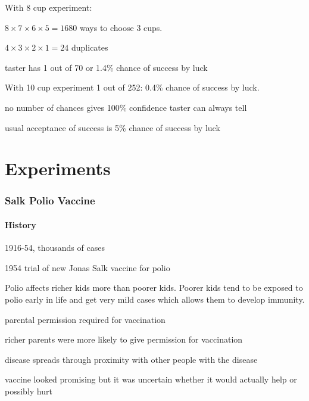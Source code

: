 \documentclass[landscape]{exam}
\begin{document}
  With 8 cup experiment:
  \begin{itemize*}
    \item $8 \times 7 \times 6 \times 5 = 1680$ ways to choose 3 cups.  
    \item $4 \times 3 \times 2 \times 1 = 24$ duplicates
    \item taster has 1 out of 70 or 1.4\% chance of success by luck
  \end{itemize*}

  With 10 cup experiment 1 out of 252: 0.4\% chance of success by luck.

  \begin{itemize*}
    \item no number of chances gives 100\% confidence taster can always tell
    \item usual acceptance of success is 5\% chance of success by luck
  \end{itemize*}


  \part{Experiments}

  \section{Salk Polio Vaccine}
  \subsection{History}
  \begin{itemize*}
    \item 1916-54, thousands of cases
    \item 1954 trial of new Jonas Salk vaccine for polio
    \item Polio affects richer kids more than poorer kids. Poorer kids tend to
      be exposed to polio early in life and get very mild cases which allows
      them to develop immunity.
    \item parental permission required for vaccination
    \item richer parents were more likely to give permission for vaccination
    \item disease spreads through proximity with other people with the disease
    \item vaccine looked promising but it was uncertain whether it would
      actually help or possibly hurt
  \end{itemize*}
\end{document}
